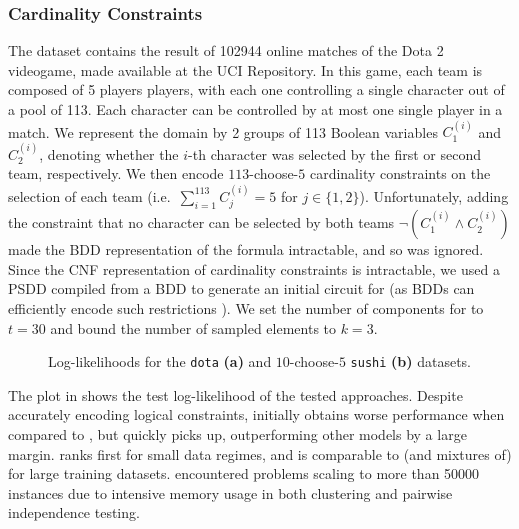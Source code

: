 \subsubsection{Cardinality Constraints}

The  dataset contains the result of \num{102944} online matches of the Dota 2
videogame, made available at the UCI Repository. In this game, each team is composed of 5 players
players, with each one controlling a single character out of a pool of 113. Each character can be
controlled by at most one single player in a match. We represent the domain by 2 groups of 113
Boolean variables $C_1^{(i)}$ and $C_2^{(i)}$, denoting whether the $i$-th character was selected
by the first or second team, respectively. We then encode $113$-choose-$5$ cardinality constraints
on the selection of each team (i.e.\ $\sum_{i=1}^113 C_j^{(i)}=5$ for $j\in\{1,2\}$).
Unfortunately, adding the constraint that no character can be selected by both teams
$\neg(C_1^{(i)}\wedge C_2^{(i)})$ made the BDD representation of the formula intractable, and so
was ignored. Since the CNF representation of cardinality constraints is intractable, we used a PSDD
compiled from a BDD to generate an initial circuit for  (as BDDs can
efficiently encode such restrictions \citep{een06}). We set the number of components for
 to $t=30$ and bound the number of sampled elements to $k=3$.

\begin{figure}[t]
  \begin{subfigure}{0.495\textwidth}
    \caption{}
    \label{fig:ll-dota}
  \end{subfigure}
  \begin{subfigure}{0.495\textwidth}
    \caption{}
    \label{fig:ll-sushi-choose}
  \end{subfigure}
  \caption{Log-likelihoods for the \texttt{dota} \textbf{(a)} and $10$-choose-$5$ \texttt{sushi}
    \textbf{(b)} datasets.}
  \label{fig:ll-cardinality}
\end{figure}

The plot in  shows the test log-likelihood of the tested approaches. Despite
accurately encoding logical constraints,  initially obtains worse performance
when compared to , but quickly picks up, outperforming other models by a
large margin.  ranks first for small data regimes, and is comparable to
 (and mixtures of) for large training datasets.  encountered
problems scaling to more than \num{50000} instances due to intensive memory usage in both
clustering and pairwise independence testing.

